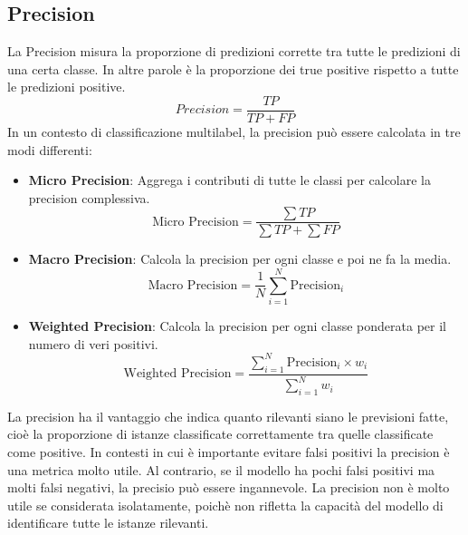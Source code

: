 \documentclass[../../Thesis.tex]{subfiles}
\begin{document}
\subsection{Precision}
La Precision misura la proporzione di predizioni corrette tra tutte le predizioni di una certa classe. In altre parole è la proporzione dei true positive rispetto a tutte le predizioni positive.
$$Precision = \frac{ TP}{ TP + FP} $$
In un contesto di classificazione multilabel, la precision può essere calcolata in tre modi differenti:

\begin{itemize}
    \item \textbf{Micro Precision}: Aggrega i contributi di tutte le classi per calcolare la precision complessiva.
    $$ \text{Micro Precision} = \frac{\sum TP}{\sum TP + \sum FP} $$
    \item \textbf{Macro Precision}: Calcola la precision per ogni classe e poi ne fa la media.
    $$ \text{Macro Precision} = \frac{1}{N} \sum_{i=1}^{N} \text{Precision}_i $$
    \item \textbf{Weighted Precision}: Calcola la precision per ogni classe ponderata per il numero di veri positivi.
    $$ \text{Weighted Precision} = \frac{\sum_{i=1}^{N} \text{Precision}_i \times w_i}{\sum_{i=1}^{N} w_i} $$
\end{itemize}
La precision ha il vantaggio che indica quanto rilevanti siano le previsioni fatte, cioè la proporzione di istanze classificate correttamente tra quelle classificate come positive. In contesti in cui è importante evitare falsi positivi la precision è una metrica molto utile. Al contrario, se il modello ha pochi falsi positivi ma molti falsi negativi, la precisio può essere ingannevole. La precision non è molto utile se considerata isolatamente, poichè non rifletta la capacità del modello di identificare tutte le istanze rilevanti.
\end{document}
